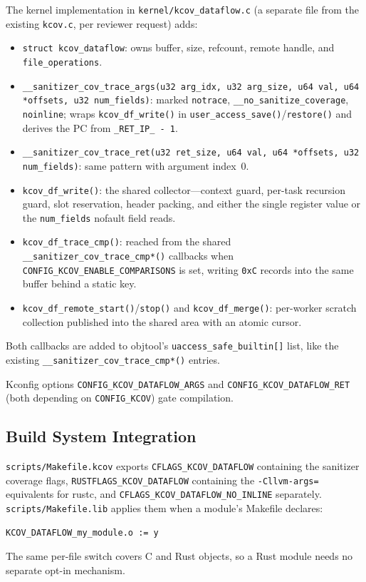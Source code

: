 \documentclass{article}
\begin{document}
The kernel implementation in \texttt{kernel/kcov\_dataflow.c} (a separate file
from the existing \texttt{kcov.c}, per reviewer request) adds:
\begin{itemize}[nosep]
  \item \texttt{struct kcov\_dataflow}: owns buffer, size, refcount, remote
        handle, and \texttt{file\_operations}.
  \item \texttt{\_\_sanitizer\_cov\_trace\_args(u32 arg\_idx, u32 arg\_size,
        u64 val, u64 *offsets, u32 num\_fields)}: marked \texttt{notrace},
        \texttt{\_\_no\_sanitize\_coverage}, \texttt{noinline}; wraps
        \texttt{kcov\_df\_write()} in
        \texttt{user\_access\_save()}/\texttt{restore()} and derives the PC
        from \texttt{\_RET\_IP\_ - 1}.
  \item \texttt{\_\_sanitizer\_cov\_trace\_ret(u32 ret\_size, u64 val,
        u64 *offsets, u32 num\_fields)}: same pattern with argument index~0.
  \item \texttt{kcov\_df\_write()}: the shared collector---context guard,
        per-task recursion guard, slot reservation, header packing, and either
        the single register value or the \texttt{num\_fields} nofault field
        reads.
  \item \texttt{kcov\_df\_trace\_cmp()}: reached from the shared
        \texttt{\_\_sanitizer\_cov\_trace\_cmp*()} callbacks when
        \texttt{CONFIG\_KCOV\_ENABLE\_COMPARISONS} is set, writing
        \texttt{0xC} records into the same buffer behind a static key.
  \item \texttt{kcov\_df\_remote\_start()}/\texttt{stop()} and
        \texttt{kcov\_df\_merge()}: per-worker scratch collection published
        into the shared area with an atomic cursor.
\end{itemize}

Both callbacks are added to objtool's \texttt{uaccess\_safe\_builtin[]} list,
like the existing \texttt{\_\_sanitizer\_cov\_trace\_cmp*()} entries.

Kconfig options \texttt{CONFIG\_KCOV\_DATAFLOW\_ARGS} and
\texttt{CONFIG\_KCOV\_DATAFLOW\_RET} (both depending on \texttt{CONFIG\_KCOV})
gate compilation.

\subsection{Build System Integration}

\texttt{scripts/Makefile.kcov} exports \texttt{CFLAGS\_KCOV\_DATAFLOW}
containing the sanitizer coverage flags, \texttt{RUSTFLAGS\_KCOV\_DATAFLOW}
containing the \texttt{-Cllvm-args=} equivalents for rustc, and
\texttt{CFLAGS\_KCOV\_DATAFLOW\_NO\_INLINE} separately.
\texttt{scripts/Makefile.lib} applies them when a module's Makefile declares:
\begin{lstlisting}
KCOV_DATAFLOW_my_module.o := y
\end{lstlisting}
The same per-file switch covers C and Rust objects, so a Rust module needs no
separate opt-in mechanism.
\end{document}
